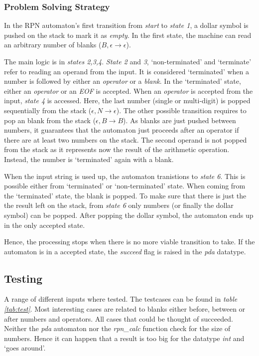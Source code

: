 \documentclass[a4paper,11pt,twoside]{article}
\begin{document}
\subsubsection{Problem Solving Strategy}
In the RPN automaton's first transition from \textit{start} to \textit{state
1}, a dollar symbol is pushed on the stack to mark it as
\textit{empty}. In the first state, the machine can read an arbitrary
number of blanks ($B,\epsilon \rightarrow \epsilon$).

The main logic is in \textit{states 2,3,4}. \textit{State 2} and
\textit{3}, `non-terminated' and `terminate' refer to reading an
operand from the input. It is considered `terminated' when a
number is followed by either an \textit{operator} or a
\textit{blank}. In the `terminated' state, either an \textit{operator}
or an \textit{EOF} is accepted. When an \textit{operator} is accepted
from the input, \textit{state 4} is accessed. Here, the last number
(single or multi-digit) is popped sequentially from the stack
($\epsilon,N \rightarrow \epsilon$). The other possible transition
requires to pop an blank from the stack ($\epsilon, B \rightarrow
B$). As blanks are just pushed between numbers, it guarantees that the
automaton just proceeds after an operator if there are at least two
numbers on the stack. The second operand is not popped from the stack
as it represents now the result of the arithmetic operation. Instead,
the number is `terminated' again with a blank.  

When the input string is used up, the automaton tranistions to
\textit{state 6}. This is possible either from `terminated' or
`non-terminated' state. When coming from the `terminated' state, the
blank is popped. To make sure that there is just the the result left
on the stack, from \textit{state 6} only numbers (or finally the
dollar symbol) can be popped. After popping the dollar symbol, the
automaton ends up in the only accepted state.

Hence, the processing stops when there is no more viable transition to
take. If the automaton is in a accepted state, the \textit{succeed}
flag is raised in the \textit{pda} datatype. 


\subsection{Testing}
A range of different inputs where tested. The testcases can be found
in \textit{table \ref{tab:test}}. Most interesting cases are related
to blanks either before, between or after numbers and operators. All
cases that could be thought of succeeded. Neither the \textit{pda} automaton
nor the \textit{rpn\_calc} function check for the size of
numbers. Hence it can happen that a result is too big for the datatype
\textit{int} and `goes around'.  
\end{document}
